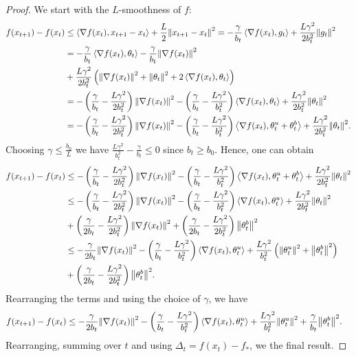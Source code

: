 \documentclass{article}
\begin{document}
\begin{proof}
    We start with the $L$-smoothness of $f$:
    \begin{align*}
        f(x_{t+1}) - f(x_t) &\leq \left \langle \nabla f(x_t), x_{t+1} - x_t \right \rangle + \frac{L}{2}{\left\lVert x_{t+1} - x_t\right\rVert}^2 = -\frac{\gamma}{b_t}\left \langle \nabla f(x_t), g_t \right \rangle + \frac{L\gamma^2}{2b_t^2}{\left\lVert g_t\right\rVert}^2 \\&= -\frac{\gamma}{b_t}\left \langle \nabla f(x_t), \theta_t \right \rangle - \frac{\gamma}{b_t}{\left\lVert\nabla f(x_t)\right\rVert}^2 \\&+ \frac{L\gamma^2}{2b_t^2}\left({\left\lVert\nabla f(x_t)\right\rVert}^2 + {\left\lVert\theta_t\right\rVert}^2 + 2\left \langle \nabla f(x_t), \theta_t \right \rangle\right) \\
        &= -\left(\frac{\gamma}{b_t} - \frac{L\gamma^2}{2b_t^2}\right){\left\lVert\nabla f(x_t)\right\rVert}^2 - \left(\frac{\gamma}{b_t} - \frac{L\gamma^2}{b_t^2}\right)\left \langle \nabla f(x_t), \theta_t \right \rangle + \frac{L\gamma^2}{2b_t^2}{\left\lVert\theta_t\right\rVert}^2 \\
        &= -\left(\frac{\gamma}{b_t} - \frac{L\gamma^2}{2b_t^2}\right){\left\lVert\nabla f(x_t)\right\rVert}^2 - \left(\frac{\gamma}{b_t} - \frac{L\gamma^2}{b_t^2}\right)\left \langle \nabla f(x_t), \theta_t^u + \theta_t^b \right \rangle + \frac{L\gamma^2}{2b_t^2}{\left\lVert\theta_t\right\rVert}^2.
    \end{align*}
    Choosing $\gamma \leq \frac{b_0}{L}$ we have $\frac{L\gamma^2}{b_t^2} - \frac{\gamma}{b_t} \leq 0$ since $b_t \geq b_0$. Hence, one can obtain
    \begin{align*}
        f(x_{t+1}) - f(x_t) &\leq -\left(\frac{\gamma}{b_t} - \frac{L\gamma^2}{2b_t^2}\right){\left\lVert\nabla f(x_t)\right\rVert}^2 - \left(\frac{\gamma}{b_t} - \frac{L\gamma^2}{b_t^2}\right)\left \langle \nabla f(x_t), \theta_t^u + \theta_t^b \right \rangle + \frac{L\gamma^2}{2b_t^2}{\left\lVert\theta_t\right\rVert}^2 \\
        &\leq -\left(\frac{\gamma}{b_t} - \frac{L\gamma^2}{2b_t^2}\right){\left\lVert\nabla f(x_t)\right\rVert}^2 - \left(\frac{\gamma}{b_t} - \frac{L\gamma^2}{b_t^2}\right)\left \langle \nabla f(x_t), \theta_t^u \right \rangle + \frac{L\gamma^2}{2b_t^2}{\left\lVert\theta_t\right\rVert}^2 \\&+ \left(\frac{\gamma}{2b_t} - \frac{L\gamma^2}{2b_t^2}\right){\left\lVert\nabla f(x_t)\right\rVert}^2 + \left(\frac{\gamma}{2b_t} - \frac{L\gamma^2}{2b_t^2}\right){\left\lVert\theta_t^b\right\rVert}^2 \\
        &\leq -\frac{\gamma}{2b_t}{\left\lVert\nabla f(x_t)\right\rVert}^2 - \left(\frac{\gamma}{b_t} - \frac{L\gamma^2}{b_t^2}\right)\left \langle \nabla f(x_t), \theta_t^u \right \rangle + \frac{L\gamma^2}{b_t^2}\left({\left\lVert\theta_t^u\right\rVert}^2 + {\left\lVert\theta_t^b\right\rVert}^2\right) \\
        &+ \left(\frac{\gamma}{2b_t} - \frac{L\gamma^2}{2b_t^2}\right){\left\lVert\theta_t^b\right\rVert}^2.
    \end{align*}
Rearranging the terms and using the choice of $\gamma$, we have
    \begin{align*}
        f(x_{t+1}) - f(x_t) &\leq -\frac{\gamma}{2b_t}{\left\lVert\nabla f(x_t)\right\rVert}^2 - \left(\frac{\gamma}{b_t} - \frac{L\gamma^2}{b_t^2}\right)\left \langle \nabla f(x_t), \theta_t^u \right \rangle + \frac{L\gamma^2}{b_t^2}{\left\lVert\theta_t^u\right\rVert}^2 +\frac{\gamma}{b_t}{\left\lVert\theta_t^b\right\rVert}^2.
    \end{align*}
Rearranging, summing over $t$ and using $\Delta_t = f(x_t) - f_*$, we  the final result.
\end{proof}
\end{document}
